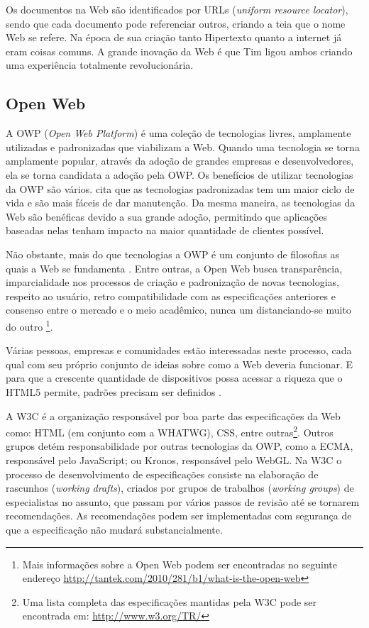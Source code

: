 Os documentos na Web são identificados por URLs (\textit{uniform
resource locator}), sendo que cada documento pode referenciar outros,
criando a \textquotedbl teia\textquotedbl{} que o nome Web se refere.
Na época de sua criação tanto Hipertexto quanto a internet já eram
coisas comuns. A grande inovação da Web é que Tim ligou ambos criando
uma experiência totalmente revolucionária.

\subsection{Open Web}

A OWP (\textit{Open Web Platform}) é uma coleção de tecnologias
livres, amplamente utilizadas e padronizadas que viabilizam a Web.
Quando uma tecnologia se torna amplamente popular, através da adoção
de grandes empresas e desenvolvedores, ela se torna candidata a adoção
pela OWP. Os benefícios de utilizar tecnologias da OWP são vários.
\citet[p. 3]{svgTime} cita que as tecnologias padronizadas tem um maior
ciclo de vida e são mais fáceis de dar manutenção. Da mesma maneira,
as tecnologias da Web são benéficas devido a sua grande adoção,
permitindo que aplicações baseadas nelas tenham impacto na maior
quantidade de clientes possível.

Não obstante, mais do que tecnologias a OWP é um conjunto de
filosofias as quais a Web se fundamenta \autocite{openWebDefinition}.
Entre outras, a Open Web busca transparência, imparcialidade nos
processos de criação e padronização de novas tecnologias,
respeito ao usuário, retro compatibilidade com as especificações
anteriores e consenso entre o mercado e o meio acadêmico, nunca
um distanciando-se muito do outro \footnote{Mais informações
sobre a Open Web podem ser encontradas no seguinte endereço
\url{http://tantek.com/2010/281/b1/what-is-the-open-web}}.

Várias pessoas, empresas e comunidades estão interessadas neste
processo, cada qual com seu próprio conjunto de ideias sobre como
a Web deveria funcionar. E para que a crescente quantidade de
dispositivos possa acessar a riqueza que o HTML5 permite, padrões
precisam ser definidos \autocite[p. 5]{aSeriousContender}.

A W3C é a organização responsável por boa parte das especificações
da Web como: HTML (em conjunto com a WHATWG), CSS, entre
outras\footnote{Uma lista completa das especificações mantidas pela
W3C pode ser encontrada em: \url{http://www.w3.org/TR/}}. Outros grupos
detém responsabilidade por outras tecnologias da OWP, como a ECMA,
responsável pelo JavaScript; ou Kronos, responsável pelo WebGL. Na
W3C o processo de desenvolvimento de especificações consiste na
elaboração de rascunhos (\textit{working drafts}), criados por grupos
de trabalhos (\textit{working groups}) de especialistas no assunto, que
passam por vários passos de revisão até se tornarem recomendações.
As recomendações podem ser implementadas com segurança de que a
especificação não mudará substancialmente.


